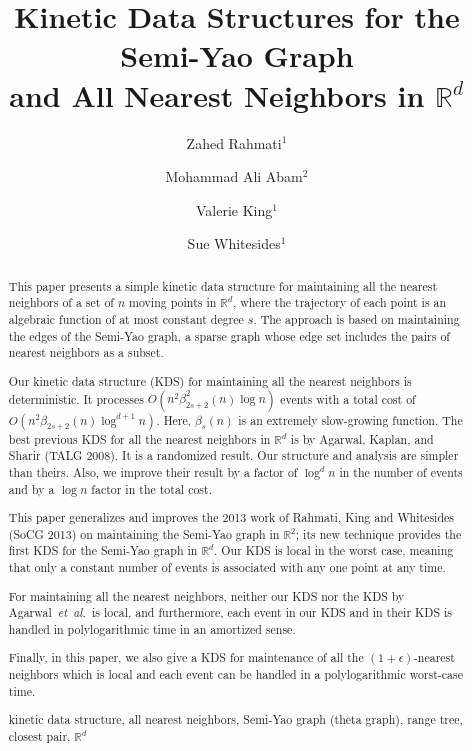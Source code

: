 \documentclass[11pt]{llncs}
\title{Kinetic Data Structures for the Semi-Yao Graph\\ and All Nearest Neighbors in $\mathbb{R}^d$}
\author{\small
Zahed Rahmati$^1$
\and
Mohammad Ali Abam$^2$
\and
Valerie King$^1$
\and
Sue Whitesides$^1$
}
\institute{\small
$^1$Dept. of Computer Science, University of Victoria, Canada. \\{\tt \{rahmati,val,sue\}@uvic.ca}\\
$^2$Dept. of Computer Engineering, Sharif University of Technology, Iran. \\{\tt abam@sharif.edu}
}
\newcommand{\etal}{\emph{et~al.}}
\newcommand{\keywords}[1]{\par\addvspace\baselineskip
\noindent\keywordname\enspace\ignorespaces#1}
\begin{document}
\maketitle
\begin{abstract}
This paper presents a simple kinetic data structure for maintaining all the nearest neighbors of a set of $n$ moving points in $\mathbb{R}^d$, where the trajectory of each point is an algebraic function of at most constant degree $s$.  The approach is based on maintaining the edges of the Semi-Yao graph, a sparse graph whose edge set includes the pairs of nearest neighbors as a subset. 

\vspace{+5pt}
Our kinetic data structure (KDS) for maintaining all the nearest neighbors is deterministic. It processes $O(n^2\beta_{2s+2}^2(n)\log n)$ events with a total cost of $O(n^2\beta_{2s+2}(n)\log^{d+1} n)$. Here, $\beta_s(n)$ is an extremely slow-growing function. The best previous KDS for all the nearest neighbors in $ \mathbb{R}^d$ is by Agarwal, Kaplan, and Sharir (TALG 2008). It is a randomized result. Our structure and analysis are simpler than theirs. Also, we improve their result by a factor of $\log^d n$ in the number of events and by a $\log n$ factor in the total cost.

\vspace{+5pt}
This paper generalizes and improves the 2013 work of Rahmati, King and Whitesides (SoCG 2013) on maintaining the Semi-Yao graph in $\mathbb{R}^2$;  its new technique provides the first KDS for the Semi-Yao graph in $\mathbb{R}^d$. Our KDS is local in the worst case, meaning that only a constant number of events is associated with any one point at any time.

\vspace{+5pt}
For maintaining all the nearest neighbors, neither our KDS nor the KDS by Agarwal~\etal~is local, and furthermore, each event in our KDS and in their KDS is handled in polylogarithmic time in an amortized sense. 

\vspace{+5pt}
Finally, in this paper, we also give a KDS for maintenance of all the $(1+\epsilon)$-nearest neighbors which is local and each event can be handled in a polylogarithmic worst-case time.
\keywords{kinetic data structure, all nearest neighbors, Semi-Yao graph (theta graph), range tree, closest pair, $\mathbb{R}^d$}
\end{abstract}
\newpage
\setcounter{page}{1}
\end{document}
